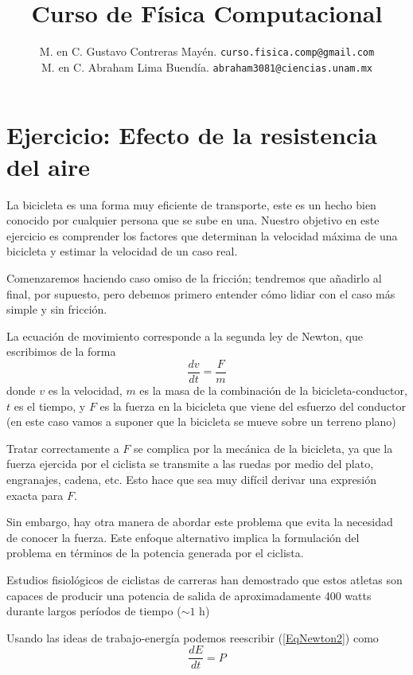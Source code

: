 \documentclass[12pt]{article}
\author{M. en C. Gustavo Contreras Mayén. \texttt{curso.fisica.comp@gmail.com}\\
M. en C. Abraham Lima Buendía. \texttt{abraham3081@ciencias.unam.mx}}
\title{Curso de Física Computacional}
\date{ }
\begin{document}
\renewcommand\labelenumii{\theenumi.{\arabic{enumii}}}
\maketitle
\fontsize{14}{14}\selectfont
\section*{Ejercicio: Efecto de la resistencia del aire}
La bicicleta es una forma muy eficiente de transporte, este es un hecho bien conocido por cualquier persona que se sube en una. Nuestro objetivo en este ejercicio es comprender los factores que determinan la velocidad máxima de una bicicleta y estimar la velocidad de un caso real.
\par
Comenzaremos haciendo caso omiso de la fricción; tendremos que añadirlo al final, por supuesto, pero debemos primero entender cómo lidiar con el caso más simple y sin fricción.
\par
La ecuación de movimiento corresponde a la segunda ley de Newton, que escribimos de la forma
\begin{equation}
\dfrac{dv}{dt} = \dfrac{F}{m}
\label{EqNewton2}
\end{equation}
donde $v$ es la velocidad, $m$ es la masa de la combinación de la bicicleta-conductor, $t$ es el tiempo, y $F$ es la fuerza en la bicicleta que viene del esfuerzo del conductor (en este caso vamos a suponer que la bicicleta se mueve sobre un terreno plano)
\par
Tratar correctamente a $F$ se complica por la mecánica de la bicicleta, ya que la fuerza ejercida por el ciclista se transmite a las ruedas por medio del plato, engranajes, cadena, etc. Esto hace que sea muy difícil derivar una expresión exacta para $F$.
\par
Sin embargo, hay otra manera de abordar este problema que evita la necesidad de conocer la fuerza. Este enfoque alternativo implica la formulación del problema en términos de la potencia generada por el ciclista.
\par
Estudios fisiológicos de ciclistas de carreras han demostrado que estos atletas son capaces de producir una potencia de salida de aproximadamente 400 watts durante largos períodos de tiempo ($\sim 1$ h)
\par
Usando las ideas de trabajo-energía podemos reescribir (\ref{EqNewton2}) como
\begin{equation}\label{EqPotencia}
\dfrac{dE}{dt} = P
\end{equation}
\end{document}
